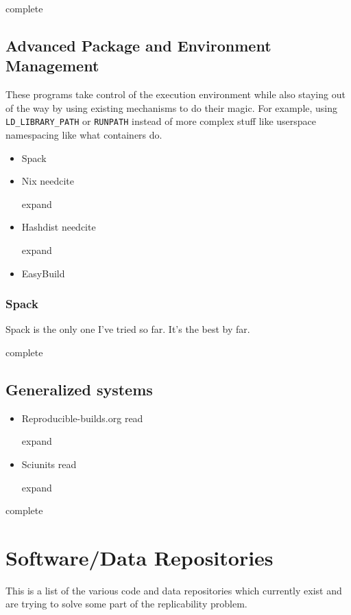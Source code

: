 \documentclass[american]{article}
\newcommand{\Read}{
	\gls{read}
}
\newcommand{\complete}{
	\gls{complete}
}
\newcommand{\needcite}{
	\gls{needcite}
}
\newcommand{\expand}{
	\gls{expand}
}
\begin{document}
\complete

\subsection{Advanced Package and Environment Management}

These programs take control of the execution environment while also staying out of the way by using existing mechanisms to do their magic. For example, using \texttt{LD\_LIBRARY\_PATH} or \texttt{RUNPATH} instead of more complex stuff like userspace namespacing like what containers do.

\begin{itemize}
\item Spack \cite{Spack}
\item Nix \needcite \expand
\item Hashdist \needcite \expand
\item EasyBuild \cite{EasyBuild}
\end{itemize}

\subsubsection{Spack}

Spack \cite{Spack} is the only one I've tried so far. It's the best by far.

\complete

\subsection{Generalized systems}

\begin{itemize}
\item Reproducible-builds.org \cite{reproducible-builds} \Read \expand
\item Sciunits \cite{sciunits} \Read \expand
\end{itemize}

\complete

\section{Software/Data Repositories}

This is a list of the various code and data repositories which currently exist and are trying to solve some part of the replicability problem.
\end{document}
